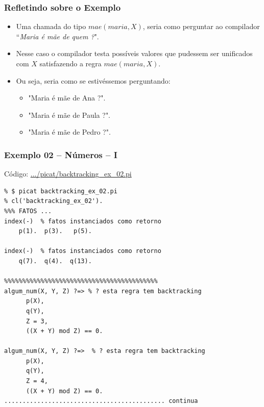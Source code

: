 \begin{frame}[fragile]
\frametitle{Refletindo sobre o Exemplo}
    
    \begin{itemize}
        \item Uma chamada do tipo $mae(maria, X)$, seria como perguntar ao compilador
        ``\textit{Maria é mãe de quem ?}".
        
        \item Nesse caso o compilador  testa  possíveis valores que pudessem ser 
        unificados com $X$ satisfazendo a regra $mae(maria,X)$.
        
        \item Ou seja, seria como se estivéssemos perguntando:
        
        \begin{itemize}
            \item "Maria é mãe de Ana ?".
            \item "Maria é mãe de Paula ?".
            \item "Maria é mãe de Pedro ?".
        \end{itemize}
   \end{itemize}
    
\end{frame}


\begin{frame}[fragile]
\frametitle{Exemplo 02 -- Números -- I}

Código: \url{.../picat/backtracking_ex_02.pi}
\begin{scriptsize}

\begin{verbatim}
% $ picat backtracking_ex_02.pi 
% cl('backtracking_ex_02').
%%% FATOS ... 
index(-)  % fatos instanciados como retorno
    p(1).  p(3).   p(5).
	
index(-)  % fatos instanciados como retorno
    q(7).  q(4).  q(13).
	
%%%%%%%%%%%%%%%%%%%%%%%%%%%%%%%%%%%%%%%%%% 
algum_num(X, Y, Z) ?=> % ? esta regra tem backtracking
      p(X),
      q(Y),
      Z = 3,
      ((X + Y) mod Z) == 0.

algum_num(X, Y, Z) ?=>  % ? esta regra tem backtracking
      p(X),
      q(Y),
      Z = 4,
      ((X + Y) mod Z) == 0.
............................................ continua
 \end{verbatim} 

\end{scriptsize}
\end{frame}


